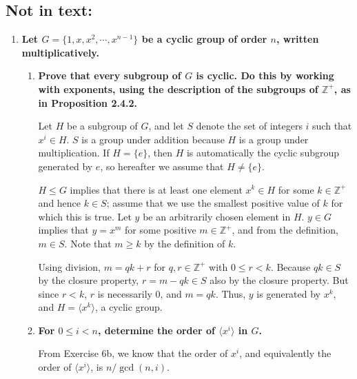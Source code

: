 \documentclass[a4paper,12pt]{article}
\begin{document}
\subsection*{Not in text:}
\begin{enumerate}
    \item
        \boldmath
        \textbf{Let $G = \{ 1, x, x^2, \cdots, x^{n - 1} \}$ be a cyclic group of order $n$, written multiplicatively.} \par
        \unboldmath
        \begin{enumerate}
            \item
                \boldmath
                \textbf{Prove that every subgroup of $G$ is cyclic. Do this by working with exponents, using the description of the subgroups of $\mathbb{Z}^+$, as in Proposition 2.4.2.} \par
                \unboldmath
                Let $H$ be a subgroup of $G$, and let $S$ denote the set of integers $i$ such that $x^i \in H$. $S$ is a group under addition because $H$ is a group under multiplication. If $H = \{ e \}$, then $H$ is automatically the cyclic subgroup generated by $e$, so hereafter we assume that $H \neq \{ e \}$. \par
                $H \leq G$ implies that there is at least one element $x^k \in H$ for some $k \in \mathbb{Z}^+$ and hence $k \in S$; assume that we use the smallest positive value of $k$ for which this is true. Let $y$ be an arbitrarily chosen element in $H$. $y \in G$ implies that $y = x^m$ for some positive $m \in \mathbb{Z}^+$, and from the definition, $m \in S$. Note that $m \geq k$ by the definition of $k$. \par
                Using division, $m = qk + r$ for $q, r \in \mathbb{Z}^+$ with $0 \leq r < k$. Because $qk \in S$ by the closure property, $r = m - qk \in S$ also by the closure property. But since $r < k$, $r$ is necessarily $0$, and $m = qk$. Thus, $y$ is generated by $x^k$, and $H = \langle x^k \rangle$, a cyclic group.

            \item
                \boldmath
                \textbf{For $0 \leq i < n$, determine the order of $\langle x^i \rangle$ in $G$.} \par
                \unboldmath
                From Exercise 6b, we know that the order of $x^i$, and equivalently the order of $\langle x^i \rangle$, is $n / \gcd(n, i)$.


\end{enumerate}
\end{enumerate}
\end{document}
